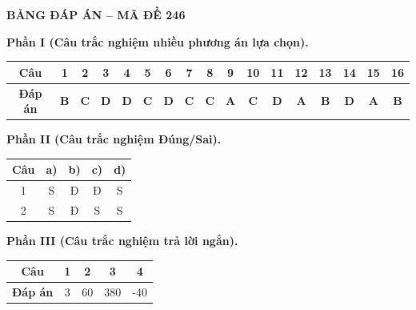 \vspace{0.4cm}
\noindent\begin{minipage}{\linewidth}
\begin{center}{\large\bfseries\color{red!80!black} BẢNG ĐÁP ÁN -- MÃ ĐỀ 246}\end{center}
\vspace{0.15cm}
\noindent\textbf{Phần I (Câu trắc nghiệm nhiều phương án lựa chọn).}\par\smallskip
\begin{center}
\begin{tabular}{|c|c|c|c|c|c|c|c|c|c|c|c|c|c|c|c|c|}\hline
\textbf{Câu} & 1 & 2 & 3 & 4 & 5 & 6 & 7 & 8 & 9 & 10 & 11 & 12 & 13 & 14 & 15 & 16 \\ \hline
\textbf{Đáp án} & \textbf{B} & \textbf{C} & \textbf{D} & \textbf{D} & \textbf{C} & \textbf{D} & \textbf{C} & \textbf{C} & \textbf{A} & \textbf{C} & \textbf{D} & \textbf{A} & \textbf{B} & \textbf{D} & \textbf{A} & \textbf{B} \\ \hline
\end{tabular}
\end{center}
\noindent\textbf{Phần II (Câu trắc nghiệm Đúng/Sai).}\par\smallskip
\begin{center}
\begin{tabular}{|c|c|c|c|c|}\hline
\textbf{Câu} & \textbf{a)} & \textbf{b)} & \textbf{c)} & \textbf{d)} \\ \hline
1 & S & Đ & Đ & S \\ \hline
2 & S & Đ & S & S \\ \hline
\end{tabular}
\end{center}
\noindent\textbf{Phần III (Câu trắc nghiệm trả lời ngắn).}\par\smallskip
\begin{center}
\begin{tabular}{|c|c|c|c|c|}\hline
\textbf{Câu} & 1 & 2 & 3 & 4 \\ \hline
\textbf{Đáp án} & 3 & 60 & 380 & -40 \\ \hline
\end{tabular}
\end{center}
\end{minipage}
